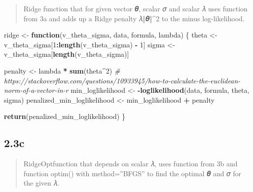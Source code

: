 \documentclass[
]{article}
\newenvironment{Shaded}{\begin{snugshade}}{\end{snugshade}}
\newcommand{\CommentTok}[1]{\textcolor[rgb]{0.56,0.35,0.01}{\textit{#1}}}
\newcommand{\ControlFlowTok}[1]{\textcolor[rgb]{0.13,0.29,0.53}{\textbf{#1}}}
\newcommand{\DecValTok}[1]{\textcolor[rgb]{0.00,0.00,0.81}{#1}}
\newcommand{\FunctionTok}[1]{\textcolor[rgb]{0.13,0.29,0.53}{\textbf{#1}}}
\newcommand{\NormalTok}[1]{#1}
\newcommand{\OtherTok}[1]{\textcolor[rgb]{0.56,0.35,0.01}{#1}}
\newcommand{\SpecialCharTok}[1]{\textcolor[rgb]{0.81,0.36,0.00}{\textbf{#1}}}
\begin{document}
\begin{quote}
Ridge function that for given vector 𝜽, scalar 𝜎 and scalar 𝜆 uses
function from 3a and adds up a Ridge penalty 𝜆‖𝜽‖\^{}2 to the minus
log-likelihood.
\end{quote}

\begin{Shaded}
\begin{Highlighting}[]
\NormalTok{ridge }\OtherTok{\textless{}{-}} \ControlFlowTok{function}\NormalTok{(v\_theta\_sigma, data, formula, lambda) \{}
\NormalTok{  theta }\OtherTok{\textless{}{-}}\NormalTok{ v\_theta\_sigma[}\DecValTok{1}\SpecialCharTok{:}\FunctionTok{length}\NormalTok{(v\_theta\_sigma) }\SpecialCharTok{{-}} \DecValTok{1}\NormalTok{]}
\NormalTok{  sigma }\OtherTok{\textless{}{-}}\NormalTok{ v\_theta\_sigma[}\FunctionTok{length}\NormalTok{(v\_theta\_sigma)]}
  
\NormalTok{  penalty }\OtherTok{\textless{}{-}}\NormalTok{ lambda }\SpecialCharTok{*} \FunctionTok{sum}\NormalTok{(theta}\SpecialCharTok{\^{}}\DecValTok{2}\NormalTok{) }\CommentTok{\# https://stackoverflow.com/questions/10933945/how{-}to{-}calculate{-}the{-}euclidean{-}norm{-}of{-}a{-}vector{-}in{-}r}
\NormalTok{  min\_loglikelihood }\OtherTok{\textless{}{-}} \SpecialCharTok{{-}}\FunctionTok{loglikelihood}\NormalTok{(data, formula, theta, sigma)}
\NormalTok{  penalized\_min\_loglikelihood }\OtherTok{\textless{}{-}}\NormalTok{ min\_loglikelihood }\SpecialCharTok{+}\NormalTok{ penalty}
  
  \FunctionTok{return}\NormalTok{(penalized\_min\_loglikelihood)}
\NormalTok{\}}
\end{Highlighting}
\end{Shaded}

\hypertarget{c}{%
\subsection{2.3c}\label{c}}

\begin{quote}
RidgeOptfunction that depends on scalar 𝜆, uses function from 3b and
function optim() with method=''BFGS'' to find the optimal 𝜽 and 𝜎 for
the given 𝜆.
\end{quote}
\end{document}
